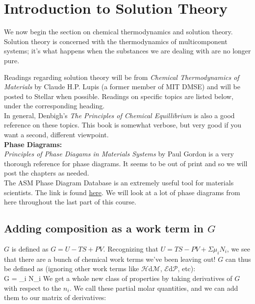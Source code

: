 \documentclass[12pt]{article}
\begin{document}
\section{Introduction to Solution Theory}
We now begin the section on chemical thermodynamics and solution theory. Solution theory is concerned with the thermodynamics of multicomponent systems; it's what happens when the substances we are dealing with are no longer pure.

Readings regarding solution theory will be from \textit{ Chemical Thermodynamics of Materials} by Claude H.P. Lupis (a former member of MIT DMSE) and will be posted to Stellar when possible. Readings on specific topics are listed below, under the corresponding heading.\\
In general, Denbigh's \textit{The Principles of Chemical Equillibrium} is also a good reference on these topics. This book is somewhat verbose, but very good if you want a second, different viewpoint.\\
\textbf{Phase Diagrams:}\\
\textit{Principles of Phase Diagams in Materials Systems} by Paul Gordon is a very thorough reference for phase diagrams. It seems to be out of print and so we will post the chapters as needed.\\
The ASM Phase Diagram Database is an extremely useful tool for materials scientists. The link is found \href{http://www1.asminternational.org/asmenterprise/apd/BrowseAPD.aspx}{here}. We will look at a lot of phase diagrams from here throughout the last part of this course.

\subsection{Adding composition as a work term in $G$}
$G$ is defined as $G = U-TS+PV$. Recognizing that $U = TS - PV + \Sigma \mu _iN_i$, we see that there are a bunch of chemical work terms we've been
leaving out! $G$ can thus be defined as (ignoring other work terms like $\mathcal{H}$d$\mathcal{M}$, $\mathcal{E}$d$\mathcal{P}$, etc):\\
\eqs G = \Sigma \mu _i N_i\eqe
We get a whole new class of properties by taking derivatives of $G$ with respect to the $n_i$. We call these partial molar quantities, and we can add them to our matrix of derivatives:
\end{document}
